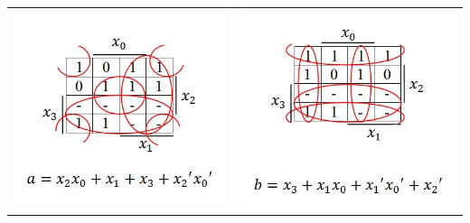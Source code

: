 \documentclass{article}
\begin{document}
\begin{table}[h!]
\begin{tabular}{ c c }
\centering
\includegraphics[scale=0.6]{a-KMap} &
\includegraphics[scale=0.6]{b-KMap} \\
\end{tabular}
\end{table}

\pagebreak
\end{document}
